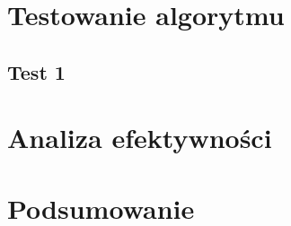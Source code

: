 \documentclass[12pt,a4paper]{article}
\begin{document}
\section{Testowanie algorytmu}
\subsection{Test 1}

\section{Analiza efektywności}
\section{Podsumowanie}
\end{document}

